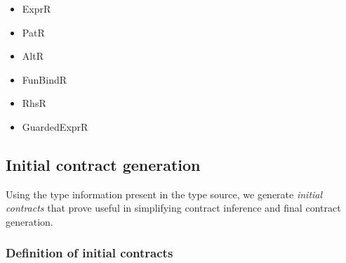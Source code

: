 \documentclass[10pt]{report}
\newcommand{\code}[1]{%
  {%
   \setlength{\fboxsep}{-2\fboxrule}%
   \fcolorbox{black}{light-gray}{\hspace{1.5pt}\strut\texttt{#1}\hspace{1.5pt}}%
  }%
}
\begin{document}
%
%

\begin{itemize}
	\item ExprR
	\item PatR
	\item AltR
	\item FunBindR
	\item RhsR
	\item GuardedExprR
\end{itemize}

\subsection{Initial contract generation}
\label{subsection:contractgeneration}

Using the type information present in the type source, we generate \textit{initial contracts} that prove useful in simplifying contract inference and final contract generation.

\subsubsection{Definition of initial contracts}
\end{document}
